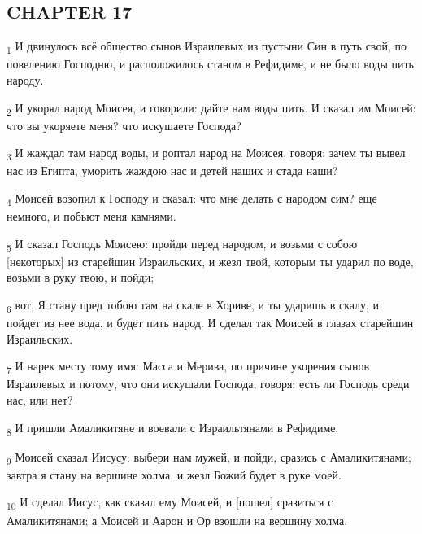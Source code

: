 \subsection{CHAPTER 17}
\begin{tcolorbox}
\textsubscript{1} И двинулось всё общество сынов Израилевых из пустыни Син в путь свой, по повелению Господню, и расположилось станом в Рефидиме, и не было воды пить народу.
\end{tcolorbox}
\begin{tcolorbox}
\textsubscript{2} И укорял народ Моисея, и говорили: дайте нам воды пить. И сказал им Моисей: что вы укоряете меня? что искушаете Господа?
\end{tcolorbox}
\begin{tcolorbox}
\textsubscript{3} И жаждал там народ воды, и роптал народ на Моисея, говоря: зачем ты вывел нас из Египта, уморить жаждою нас и детей наших и стада наши?
\end{tcolorbox}
\begin{tcolorbox}
\textsubscript{4} Моисей возопил к Господу и сказал: что мне делать с народом сим? еще немного, и побьют меня камнями.
\end{tcolorbox}
\begin{tcolorbox}
\textsubscript{5} И сказал Господь Моисею: пройди перед народом, и возьми с собою [некоторых] из старейшин Израильских, и жезл твой, которым ты ударил по воде, возьми в руку твою, и пойди;
\end{tcolorbox}
\begin{tcolorbox}
\textsubscript{6} вот, Я стану пред тобою там на скале в Хориве, и ты ударишь в скалу, и пойдет из нее вода, и будет пить народ. И сделал так Моисей в глазах старейшин Израильских.
\end{tcolorbox}
\begin{tcolorbox}
\textsubscript{7} И нарек месту тому имя: Масса и Мерива, по причине укорения сынов Израилевых и потому, что они искушали Господа, говоря: есть ли Господь среди нас, или нет?
\end{tcolorbox}
\begin{tcolorbox}
\textsubscript{8} И пришли Амаликитяне и воевали с Израильтянами в Рефидиме.
\end{tcolorbox}
\begin{tcolorbox}
\textsubscript{9} Моисей сказал Иисусу: выбери нам мужей, и пойди, сразись с Амаликитянами; завтра я стану на вершине холма, и жезл Божий будет в руке моей.
\end{tcolorbox}
\begin{tcolorbox}
\textsubscript{10} И сделал Иисус, как сказал ему Моисей, и [пошел] сразиться с Амаликитянами; а Моисей и Аарон и Ор взошли на вершину холма.
\end{tcolorbox}
